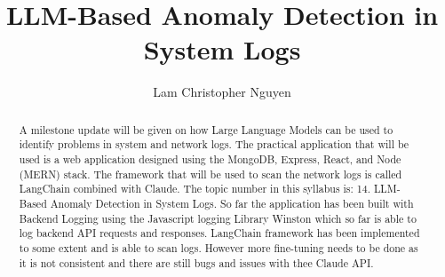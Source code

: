 \documentclass[sigconf]{acmart}
\begin{document}
\title{LLM-Based Anomaly Detection in System Logs}

\author{Lam Christopher Nguyen}


\renewcommand{\shortauthors}{Nguyen}

\begin{abstract}

A milestone update will be given on how Large Language Models can be used to identify problems in system and network logs. The practical application that will be used is a web application designed using the MongoDB, Express, React, and Node (MERN) stack. The framework that will be used to scan the network logs is called LangChain combined with Claude. The topic number in this syllabus is: 14. LLM-Based Anomaly Detection in System Logs. So far the application has been built with Backend Logging using the Javascript logging Library Winston which so far is able to log backend API requests and responses. LangChain framework has been implemented to some extent and is able to scan logs. However more fine-tuning needs to be done as it is not consistent and there are still bugs and issues with thee Claude API.

\end{abstract}
\end{document}
